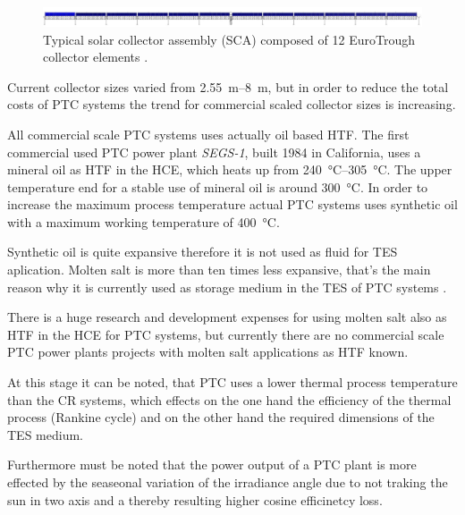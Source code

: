 \begin{figure}[htbp] 
\centering
\includegraphics[width=1\linewidth]{FIG/SCA_EuroTrough}
\caption[Typical solar collector assembly composed of 12 EuroTrough collector elements.]{Typical solar collector assembly (SCA) composed of 12 EuroTrough collector elements \cite{VonReeken2014}.}\label{SCA_EuroTrough}
\end{figure}
Current collector sizes varied from \SIrange{2.55}{8}{\metre}, but in order to reduce the total costs of PTC systems the trend for commercial scaled collector sizes is increasing. \cite{AbengoaSolar2013b,Pitz-Paal.2013,VonReeken2014}

All commercial scale PTC systems uses actually oil based HTF. The first commercial used PTC power plant \emph{SEGS-1}, built 1984 in California, uses a mineral oil as HTF in the HCE, which heats up from \SIrange{240}{305}{\celsius}. The upper temperature end for a stable use of mineral oil is around \SI{300}{\celsius}. In order to increase the maximum process temperature actual PTC systems uses synthetic oil with a maximum working temperature of \SI{400}{\celsius}. \cite{Gil2010,Richter2013,Therminol2015}

Synthetic oil is quite expansive therefore it is not used as fluid for TES aplication. Molten salt is more than ten times less expansive, that's the main reason why it is currently used as storage medium in the TES of PTC systems \cite{Gil2010}. 

There is a huge research and development expenses for using molten salt also as HTF in the HCE for PTC systems, but currently there are no commercial scale PTC power plants projects with molten salt applications as HTF known. \cite{Maccari2015}

At this stage it can be noted, that PTC uses a lower thermal process temperature than the CR systems, which effects on the one hand the efficiency of the thermal process (Rankine cycle) and on the other hand the required dimensions of the TES medium. 

Furthermore must be noted that the power output of a PTC plant is more effected by the seaseonal variation of the irradiance angle due to not traking the sun in two axis and a thereby resulting higher cosine efficinetcy loss. \cite{Jorgenson2013}

\pagebreak
